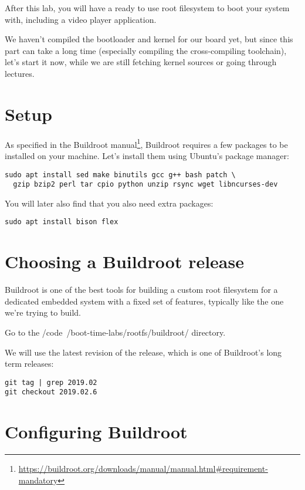
After this lab, you will have a ready to use root filesystem to boot
your system with, including a video player application.

We haven't compiled the bootloader and kernel for our board yet,
but since this part can take a long time (especially compiling the
cross-compiling toolchain), let's start it now, while we are still
fetching kernel sources or going through lectures.

\section{Setup}

As specified in the Buildroot
manual\footnote{\url{https://buildroot.org/downloads/manual/manual.html\#requirement-mandatory}},
Buildroot requires a few packages to be installed on your
machine. Let's install them using Ubuntu's package manager:

\begin{verbatim}
sudo apt install sed make binutils gcc g++ bash patch \
  gzip bzip2 perl tar cpio python unzip rsync wget libncurses-dev
\end{verbatim}

You will later also find that you also need extra packages:

\begin{verbatim}
sudo apt install bison flex
\end{verbatim}

\section{Choosing a Buildroot release}

Buildroot is one of the best tools for building a custom root filesystem
for a dedicated embedded system with a fixed set of features, typically
like the one we're trying to build.

Go to the /code{~/boot-time-labs/rootfs/buildroot/} directory.

We will use the latest revision of the  release, which is
one of Buildroot's long term releases:

\begin{verbatim}
git tag | grep 2019.02
git checkout 2019.02.6
\end{verbatim}

\section{Configuring Buildroot}

